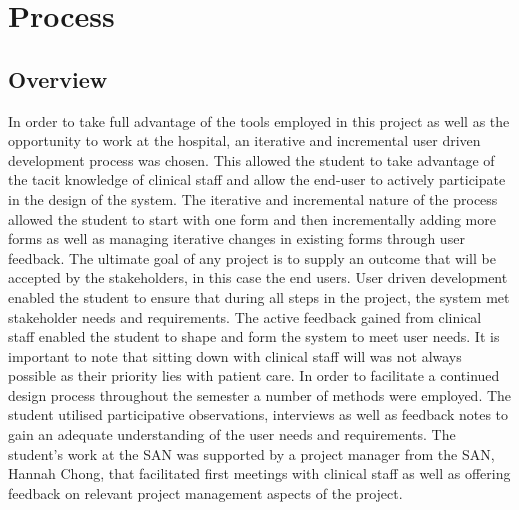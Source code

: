 \section{Process}
\subsection{Overview}
\label{Overview}
In order to take full advantage of the tools employed in this project as well as the opportunity to work at the hospital, an iterative and incremental user driven development process was chosen. This allowed the student to take advantage of the tacit knowledge of clinical staff and allow the end-user to actively participate in the design of the system. The iterative and incremental nature of the process allowed the student to start with one form and then incrementally adding more forms as well as managing iterative changes in existing forms through user feedback. The ultimate goal of any project is to supply an outcome that will be accepted by the stakeholders, in this case the end users. User driven development enabled the student to ensure that during all steps in the project, the system met stakeholder needs and requirements. The active feedback gained from clinical staff enabled the student to shape and form the system to meet user needs. It is important to note that sitting down with clinical staff will was not always possible as their priority lies with patient care. In order to facilitate a continued design process throughout the semester a number of methods were employed. The student utilised participative observations, interviews as well as feedback notes to gain an adequate understanding of the user needs and requirements. The student's work at the SAN was supported by a project manager from the SAN, Hannah Chong, that facilitated first meetings with clinical staff as well as offering feedback on relevant project management aspects of the project.

